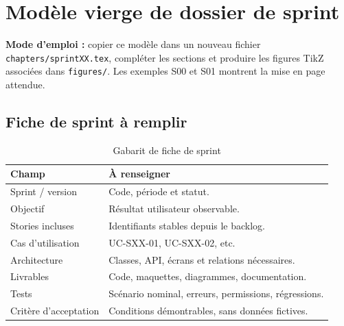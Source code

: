 \chapter{Modèle vierge de dossier de sprint}
\begin{notebox}
\textbf{Mode d’emploi :} copier ce modèle dans un nouveau fichier \texttt{chapters/sprintXX.tex}, compléter les sections et produire les figures TikZ associées dans \texttt{figures/}. Les exemples S00 et S01 montrent la mise en page attendue.
\end{notebox}
\section{Fiche de sprint à remplir}
\begin{table}[htbp]\centering\small
\caption{Gabarit de fiche de sprint}
\begin{tabularx}{\textwidth}{@{}P{40mm}Y@{}}\toprule\textbf{Champ} & \textbf{À renseigner}\\\midrule
Sprint / version & Code, période et statut.\\
Objectif & Résultat utilisateur observable.\\
Stories incluses & Identifiants stables depuis le backlog.\\
Cas d’utilisation & UC-SXX-01, UC-SXX-02, etc.\\
Architecture & Classes, API, écrans et relations nécessaires.\\
Livrables & Code, maquettes, diagrammes, documentation.\\
Tests & Scénario nominal, erreurs, permissions, régressions.\\
Critère d’acceptation & Conditions démontrables, sans données fictives.\\
\bottomrule\end{tabularx}\end{table}

